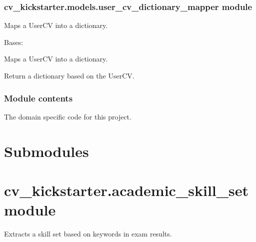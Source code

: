 \documentclass[letterpaper,10pt,english]{sphinxmanual}
\begin{document}
\subsubsection{cv\_kickstarter.models.user\_cv\_dictionary\_mapper module}
\label{cv_kickstarter.models:cv-kickstarter-models-user-cv-dictionary-mapper-module}\label{cv_kickstarter.models:module-cv_kickstarter.models.user_cv_dictionary_mapper}
Maps a UserCV into a dictionary.

\begin{fulllineitems}
\label{cv_kickstarter.models:cv_kickstarter.models.user_cv_dictionary_mapper.UserCVDictionaryMapper}
Bases: 

Maps a UserCV into a dictionary.

\begin{fulllineitems}
\label{cv_kickstarter.models:cv_kickstarter.models.user_cv_dictionary_mapper.UserCVDictionaryMapper.user_cv_dict}
Return a dictionary based on the UserCV.

\end{fulllineitems}


\end{fulllineitems}



\subsubsection{Module contents}
\label{cv_kickstarter.models:module-cv_kickstarter.models}\label{cv_kickstarter.models:module-contents}
The domain specific code for this project.


\section{Submodules}
\label{cv_kickstarter:submodules}

\section{cv\_kickstarter.academic\_skill\_set module}
\label{cv_kickstarter:module-cv_kickstarter.academic_skill_set}\label{cv_kickstarter:cv-kickstarter-academic-skill-set-module}
Extracts a skill set based on keywords in exam results.
\end{document}
